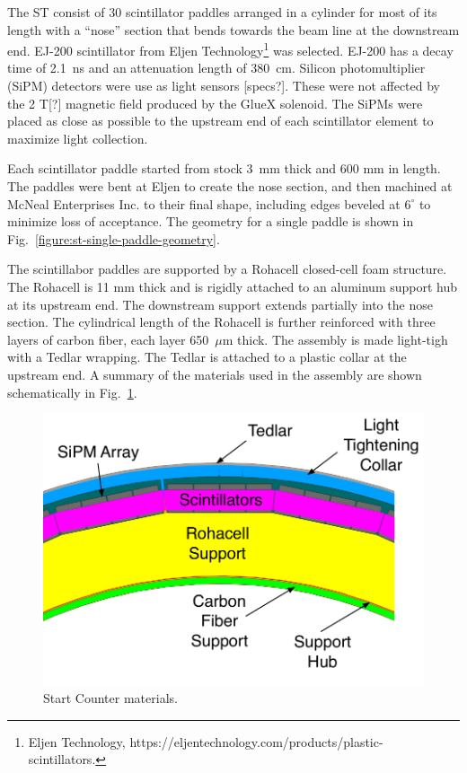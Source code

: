 The ST consist of 30 scintillator paddles arranged in a cylinder for most of
its length with a ``nose'' section that bends towards the beam line at
the downstream end. EJ-200 scintillator from Eljen
Technology\footnote{Eljen Technology, https://eljentechnology.com/products/plastic-scintillators.
	}
was selected. EJ-200 has a decay time
of 2.1~ns and an attenuation length of 380~cm. Silicon
photomultiplier (SiPM) detectors were use as light sensors [specs?]. These were
not affected by the 2 T[?] magnetic field produced by the GlueX
solenoid. The SiPMs were placed as close as possible to the upstream
end of each scintillator element to maximize light collection.

Each scintillator paddle started from stock 3~mm thick and 600 mm in
length. The paddles were bent at Eljen to create the nose section, and
then machined at McNeal Enterprises Inc.\cite{mcneal-reference} to
their final shape, including edges beveled at $6^\circ$ to minimize
loss of acceptance. The geometry for a single paddle is shown in
Fig.~\ref{figure:st-single-paddle-geometry}.

The scintillabor paddles are supported by a Rohacell closed-cell foam
structure. The Rohacell is 11 mm thick and is rigidly attached to an
aluminum support hub at its upstream end. The downstream support
extends partially into the nose section. The cylindrical length of the
Rohacell is further reinforced with three layers of carbon fiber, each
layer 650~$\mu$m thick. The assembly is made light-tigh with a Tedlar
wrapping. The Tedlar is attached to a plastic collar at the upstream
end. A summary of the materials used in the assembly are shown
schematically in Fig.~\ref{fig:st-materials}.

\begin{figure}[!htb]
  \centering
  \includegraphics[width=1.0\columnwidth]{figures/st_materials.pdf}
  \caption{Start Counter materials.}
  \label{fig:st-materials}
\end{figure}

